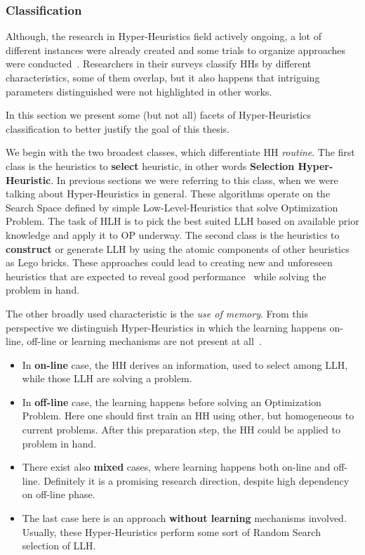 \subsubsection{Classification}
Although, the research in Hyper-Heuristics field actively ongoing, a lot of different instances were already created and some trials to organize approaches were conducted~\cite{ryser2014review,drake2019recent,burke2019classification,kerschke2019automated}.
Researchers in their surveys classify HHs by different characteristics, some of them overlap, but it also happens that intriguing parameters distinguished were not highlighted in other works. 

In this section we present some (but not all) facets of Hyper-Heuristics classification to better justify the goal of this thesis.


We begin with the two broadest classes, which differentiate HH \textit{routine}.
The first class is the heuristics to \textbf{select} heuristic, in other words \textbf{Selection Hyper-Heuristic}. In previous sections we were referring to this class, when we were talking about Hyper-Heuristics in general. These algorithms operate on the Search Space defined by simple Low-Level-Heuristics that solve Optimization Problem. The task of HLH is to pick the best suited LLH based on available prior knowledge and apply it to OP underway.
The second class is the heuristics to \textbf{construct} or generate LLH by using the atomic components of other heuristics as Lego bricks. These approaches could lead to creating new and unforeseen heuristics that are expected to reveal good performance~\cite{burke2019classification} while solving the problem in hand.


The other broadly used characteristic is the \textit{use of memory}. From this perspective we distinguish Hyper-Heuristics in which the learning happens on-line, off-line or learning mechanisms are not present at all~\cite{ryser2014review,burke2019classification}.
\begin{itemize}
	\item In \textbf{on-line} case, the HH derives an information, used to select among LLH, while those LLH are solving a problem.

	\item In \textbf{off-line} case, the learning happens before solving an Optimization Problem. Here one should first train an HH using other, but homogeneous to current problems. After this preparation step, the HH could be applied to problem in hand.

	\item There exist also \textbf{mixed} cases, where learning happens both on-line and off-line. Definitely it is a promising research direction, despite high dependency on off-line phase.
	
	\item The last case here is an approach \textbf{without learning} mechanisms involved. Usually, these Hyper-Heuristics perform some sort of Random Search selection of LLH.
\end{itemize}


